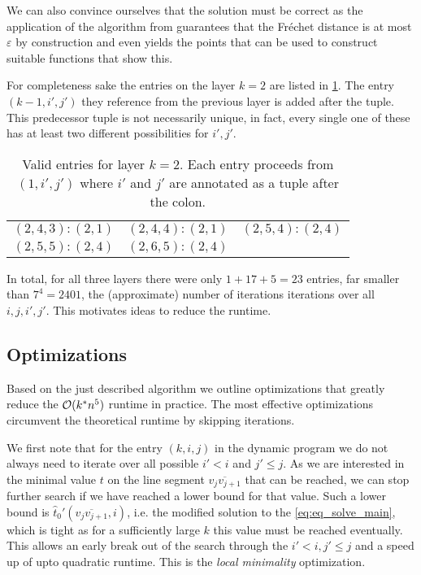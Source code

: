 We can also convince ourselves that the solution must be correct as the application of the algorithm from \citeauthor{computing_the_frechet_distance_between_two_polygonal_curves} guarantees that the Fréchet distance is at most \(\varepsilon\) by construction and even yields the points that can be used to construct suitable functions that show this. 

For completeness sake the entries on the layer \(k = 2\) are listed in \cref{tab:exlayer2}. The entry \((k - 1, i', j')\) they reference from the previous layer is added after the tuple. This predecessor tuple is not necessarily unique, in fact, every single one of these has at least two different possibilities for \(i', j'\).
\begin{table}[ht]
\centering
\begin{tabular}{|ccc|}
\hline
$(2,4,3):(2, 1)$ & $(2,4,4):(2, 1)$ & $(2,5,4):(2,4)$ \\
$(2,5,5):(2,4)$ & $(2,6,5):(2,4)$ & \\
\hline
\end{tabular}
	\caption{Valid entries for layer \(k = 2\). Each entry proceeds from \((1, i', j')\) where \(i'\) and \(j'\) are annotated as a tuple after the colon.}
\label{tab:exlayer2}
\end{table}

In total, for all three layers there were only \(1 + 17 + 5 = 23\) entries, far smaller than \(7^4 = 2401\), the (approximate) number of iterations iterations over all \(i, j, i', j'\). This motivates ideas to reduce the runtime.

\subsection{Optimizations}
\label{ssec:optimizations}
Based on the just described algorithm we outline optimizations that greatly reduce the \(\mathcal{O}(k^*n^5)\) runtime in practice. The most effective optimizations circumvent the theoretical runtime by skipping iterations. 

We first note that for the entry \((k, i, j)\) in the dynamic program we do not always need to iterate over all possible \(i' < i\) and \(j' \leq j\). As we are interested in the minimal value \(t\) on the line segment \(\overline{v_{j}v_{j+1}}\) that can be reached, we can stop further search if we have reached a lower bound for that value. Such a lower bound is \(\hat t_0'(\overline{v_{j}v_{j+1}}, i)\), i.e. the modified solution to the \cref{eq:eq_solve_main}, which is tight as for a sufficiently large \(k\) this value must be reached eventually. This allows an early break out of the search through the \(i' < i, j'\leq j\) and a speed up of upto quadratic runtime. This is the \emph{local minimality} optimization. 

